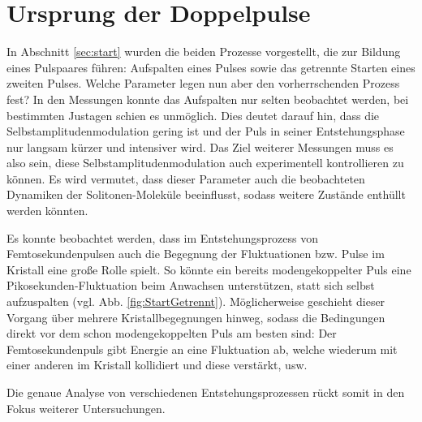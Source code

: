 \documentclass[bachelor,       %
               twoside,        %
               BCOR10mm,       %
               liststotoc,nomtotoc,bibtotoc, %
               english,ngerman, %
               final,          %
               ]{GAUBM}
\begin{document}
\section{Ursprung der Doppelpulse}
\label{sec:ursprung}
In Abschnitt \ref{sec:start} wurden die beiden Prozesse vorgestellt, die zur Bildung eines Pulspaares führen:
Aufspalten eines Pulses sowie das getrennte Starten eines zweiten Pulses.
Welche Parameter legen nun aber den vorherrschenden Prozess fest?
In den Messungen konnte das Aufspalten nur selten beobachtet werden, bei bestimmten Justagen schien es unmöglich.
Dies deutet darauf hin, dass die Selbstamplitudenmodulation gering ist und der Puls in seiner Entstehungsphase nur langsam kürzer und intensiver wird.
Das Ziel weiterer Messungen muss es also sein, diese Selbstamplitudenmodulation auch experimentell kontrollieren zu können.
Es wird vermutet, dass dieser Parameter auch die beobachteten Dynamiken der Solitonen-Moleküle beeinflusst, sodass weitere Zustände enthüllt werden könnten.

Es konnte beobachtet werden, dass im Entstehungsprozess von Femtosekundenpulsen auch die Begegnung der Fluktuationen bzw. Pulse im Kristall eine große Rolle spielt.
So könnte ein bereits modengekoppelter Puls eine Pikosekunden-Fluktuation beim Anwachsen unterstützen, statt sich selbst aufzuspalten (vgl. Abb. \ref{fig:StartGetrennt}).
Möglicherweise geschieht dieser Vorgang über mehrere Kristallbegegnungen hinweg, sodass die Bedingungen direkt vor dem schon modengekoppelten Puls am besten sind:
Der Femtosekundenpuls gibt Energie an eine Fluktuation ab, welche wiederum mit einer anderen im Kristall kollidiert und diese verstärkt, usw.

Die genaue Analyse von verschiedenen Entstehungsprozessen rückt somit in den Fokus weiterer Untersuchungen.

\appendix
\end{document}
